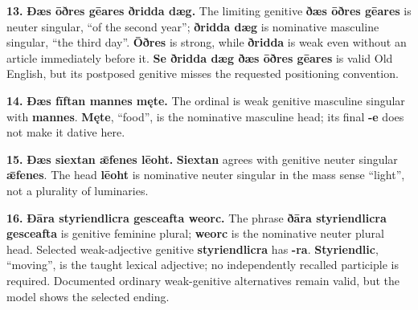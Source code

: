 \par\begin{minipage}{\linewidth}\raggedright
\textbf{13.} \textbf{Ðæs ōðres gēares ðridda dæg.} The limiting genitive \textbf{ðæs ōðres gēares} is neuter singular, “of the second year”; \textbf{ðridda dæg} is nominative masculine singular, “the third day”. \textbf{Ōðres} is strong, while \textbf{ðridda} is weak even without an article immediately before it. \textbf{Se ðridda dæg ðæs ōðres gēares} is valid Old English, but its postposed genitive misses the requested positioning convention.

\end{minipage}\par\addvspace{4pt}

\par\begin{minipage}{\linewidth}\raggedright
\textbf{14.} \textbf{Ðæs fīftan mannes męte.} The ordinal is weak genitive masculine singular with \textbf{mannes}. \textbf{Męte}, “food”, is the nominative masculine head; its final \textbf{-e} does not make it dative here.

\end{minipage}\par\addvspace{4pt}

\par\begin{minipage}{\linewidth}\raggedright
\textbf{15.} \textbf{Ðæs siextan ǣfenes lēoht.} \textbf{Siextan} agrees with genitive neuter singular \textbf{ǣfenes}. The head \textbf{lēoht} is nominative neuter singular in the mass sense “light”, not a plurality of luminaries.

\end{minipage}\par\addvspace{4pt}

\par\begin{minipage}{\linewidth}\raggedright
\textbf{16.} \textbf{Ðāra styriendlicra gesceafta weorc.} The phrase \textbf{ðāra styriendlicra gesceafta} is genitive feminine plural; \textbf{weorc} is the nominative neuter plural head. Selected weak-adjective genitive \textbf{styriendlicra} has \textbf{-ra}. \textbf{Styriendlic}, “moving”, is the taught lexical adjective; no independently recalled participle is required. Documented ordinary weak-genitive alternatives remain valid, but the model shows the selected ending.

\end{minipage}\par\addvspace{4pt}

